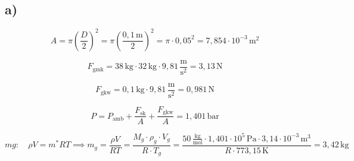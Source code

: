 

\subsection*{a)}

\[
A = \pi \left( \frac{D}{2} \right)^2 = \pi \left( \frac{0,1\, \text{m}}{2} \right)^2 = \pi \cdot 0,05^2 = 7,854 \cdot 10^{-3} \, \text{m}^2
\]

\[
F_{\text{gmk}} = 38 \, \text{kg} \cdot 32 \, \text{kg} \cdot 9,81 \, \frac{\text{m}}{\text{s}^2} = 3,13 \, \text{N}
\]

\[
F_{\text{gkw}} = 0,1 \, \text{kg} \cdot 9,81 \, \frac{\text{m}}{\text{s}^2} = 0,981 \, \text{N}
\]

\[
P = P_{\text{amb}} + \frac{F_{\text{sk}}}{A} + \frac{F_{\text{gkw}}}{A} = 1,401 \, \text{bar}
\]

\[
mg: \quad \rho V = m^* RT \implies m_g = \frac{\rho V}{RT} = \frac{M_g \cdot \rho_g \cdot V_g}{R \cdot T_g} = \frac{50 \, \frac{\text{kg}}{\text{mol}} \cdot 1,401 \cdot 10^5 \, \text{Pa} \cdot 3,14 \cdot 10^{-3} \, \text{m}^3}{R \cdot 773,15 \, \text{K}} = 3,42 \, \text{kg}
\]